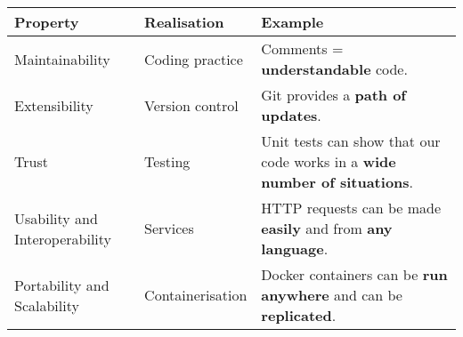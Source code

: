 \begin{tabular}{p{4.2cm}|p{2.7cm}|p{5.8cm}}

      \textbf{Property} & \textbf{Realisation} & \textbf{Example}  \\

      \hline

      Maintainability & Coding practice & Comments = \textbf{understandable} code. \\

      \hline

      Extensibility & Version control & Git provides a \textbf{path of updates}. \\

      \hline

      Trust & Testing & Unit tests can show that our code works in a \textbf{wide number of situations}.  \\

      \hline

      Usability and Interoperability & Services & HTTP requests can be made \textbf{easily} and from \textbf{any language}. \\

      \hline

      Portability and Scalability & Containerisation & Docker containers can be \textbf{run anywhere} and can be \textbf{replicated}. \\

      \hline

\end{tabular}
